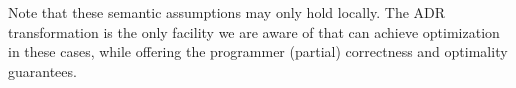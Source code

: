 Note that these semantic assumptions may only hold locally.  The ADR
transformation is the only facility we are aware of that can achieve
optimization in these cases, while offering the programmer (partial)
correctness and optimality guarantees.













